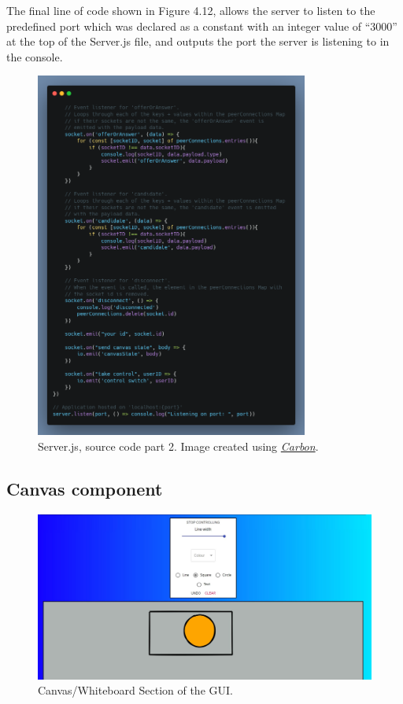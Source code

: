 The final line of code shown in Figure 4.12, allows the server to listen to the predefined port which was declared as a constant with an integer value of “3000” at the top of the Server.js file, and outputs the port the server is listening to in the console.

\begin{figure}[H]
    \centering
    \includegraphics[width=0.8\textwidth]{img/SystemDesign/serverJs_2.png}
    \caption{Server.js, source code part 2. Image created using \href{https://carbon.now.sh/}{\textit{Carbon}}.}
\end{figure}
\subsection{Canvas component}
\label{canvas-component}
\begin{figure}[H]
    \centering
    \includegraphics[scale=0.4]{img/SystemDesign/Canvas/canvas-screenshot.JPG}
    \caption{Canvas/Whiteboard Section of the GUI.}
    \label{canvas-screenshot}
\end{figure}

